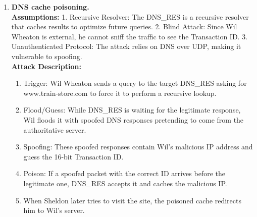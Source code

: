 \documentclass{article}
\begin{document}
\begin{enumerate}
    \item[\textbf{3.}] \textbf{DNS cache poisoning.} \\
    \textbf{Assumptions:} 1. Recursive Resolver: The DNS\_RES is a recursive resolver that caches results to optimize future queries. 2. Blind Attack: Since Wil Wheaton is external, he cannot sniff the traffic to see the Transaction ID. 3. Unauthenticated Protocol: The attack relies on DNS over UDP, making it vulnerable to spoofing. \\
    \textbf{Attack Description:} 
    \begin{enumerate}
        \item Trigger: Wil Wheaton sends a query to the target DNS\_RES asking for www.train-store.com to force it to perform a recursive lookup. 
        \item Flood/Guess: While DNS\_RES is waiting for the legitimate response, Wil floods it with spoofed DNS responses pretending to come from the authoritative server. 
        \item Spoofing: These spoofed responses contain Wil's malicious IP address and guess the 16-bit Transaction ID. 
        \item Poison: If a spoofed packet with the correct ID arrives before the legitimate one, DNS\_RES accepts it and caches the malicious IP. 
        \item When Sheldon later tries to visit the site, the poisoned cache redirects him to Wil's server.
    \end{enumerate}
\end{enumerate}
\end{document}
